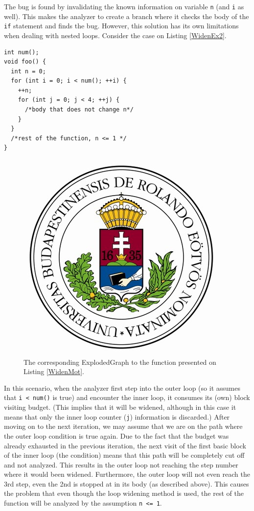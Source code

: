 The bug is found by invalidating the known information on variable
\texttt{n} (and \texttt{i} as well). This makes the analyzer to create a 
branch
where it checks the body of the \texttt{if} statement and finds the bug.
However, this solution has its own limitations when dealing with nested 
loops. 
Consider the case on Listing \ref{WidenEx2}.
\begin{lstlisting}
int num();
void foo() {
  int n = 0;
  for (int i = 0; i < num(); ++i) {
    ++n;
    for (int j = 0; j < 4; ++j) {
      /*body that does not change n*/
    }
  }
  /*rest of the function, n <= 1 */
}\end{lstlisting}

\begin{figure}[h]
	\centering
	\includegraphics[scale=0.3]{img/elte-cimer}
	\caption{The corresponding ExplodedGraph to the function presented on 
		Listing \ref{WidenMot}.}
	\label{fig:eg_mot_1}
\end{figure}

In this scenario, when the analyzer first step into the outer loop (so it assumes
that \texttt{i < num()} is true) and encounter the inner loop, it consumes
its (own) block visiting budget. (This implies that it will be widened, although
in this case it means that only the inner loop counter (\texttt{j}) information
is discarded.) After moving on to the next iteration, we may assume that we
are on the path where the outer loop condition is true again. Due to the fact that the budget was already exhausted in the previous iteration, the next visit of the first
basic block of the inner loop (the condition) means that this path will be
completely cut off and not analyzed. This results in the outer loop not reaching the step number where it would been widened. Furthermore, the outer loop
will not even reach the 3rd step, even the 2nd is stopped at in its body
(as described above). This causes the problem that even though the 
loop widening method is used, the rest of the function will be analyzed by the 
assumption \texttt{n <= 1}.

